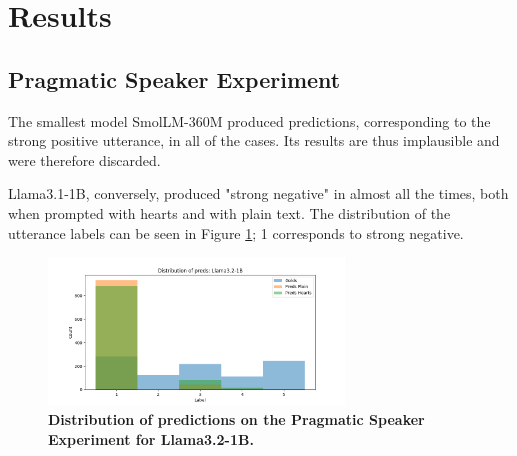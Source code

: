 \documentclass[11pt]{article}
\begin{document}







\section{Results}
\label{sec:res}


\subsection{Pragmatic Speaker Experiment}

The smallest model SmolLM-360M produced predictions, corresponding to the strong positive utterance, in all of the cases. Its results are thus implausible and were therefore discarded.

Llama3.1-1B, conversely, produced "strong negative" in almost all the times, both when prompted with hearts and with plain text. The distribution of the utterance labels can be seen in Figure \ref{fig:exp2-overall}; 1 corresponds to strong negative. 

\begin{figure}[t]
    \centering
    \includegraphics[width=0.7\textwidth]{plots/speaker_experiment/llama3.2-1B_distribution}
    \caption{\textbf{Distribution of predictions on the Pragmatic Speaker Experiment for Llama3.2-1B.}}
    \label{fig:exp2-overall}
\end{figure}
\end{document}

